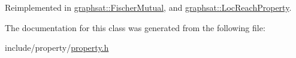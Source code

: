 Reimplemented in \mbox{\hyperlink{classgraphsat_1_1_fischer_mutual_a11572dd4ab57bd628b3424f5aa2b9b47}{graphsat\+::\+Fischer\+Mutual}}, and \mbox{\hyperlink{classgraphsat_1_1_loc_reach_property_a79c9d5f4ad6aa9ccf0033d1c5b06ddb8}{graphsat\+::\+Loc\+Reach\+Property}}.



The documentation for this class was generated from the following file\+:\begin{DoxyCompactItemize}
\item 
include/property/\mbox{\hyperlink{property_8h}{property.\+h}}\end{DoxyCompactItemize}
